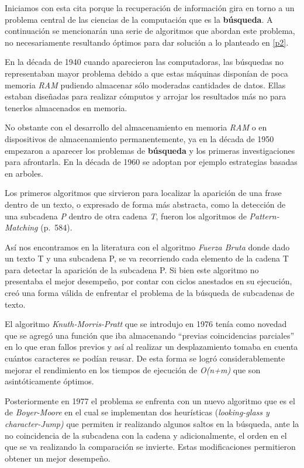 \documentclass[
  10,
  openany]{book}
\begin{document}
Iniciamos con esta cita porque la recuperación de información gira en torno a un problema central de las ciencias de la computación que es la \textbf{búsqueda}. A continuación se mencionarán una serie de algoritmos que abordan este problema, no necesariamente resultando óptimos para dar solución a lo planteado en \ref{p2}.

En la década de 1940 cuando aparecieron las computadoras, las búsquedas no representaban mayor problema debido a que estas máquinas disponían de poca memoria \emph{RAM} pudiendo almacenar sólo moderadas cantidades de datos. Ellas estaban diseñadas para realizar cómputos y arrojar los resultados más no para tenerlos almacenados en memoria.

No obstante con el desarrollo del almacenamiento en memoria \emph{RAM} o en dispositivos de almacenamiento permanentemente, ya en la década de 1950 empezaron a aparecer los problemas de \textbf{búsqueda} y los primeras investigaciones para afrontarla. En la década de 1960 se adoptan por ejemplo estrategias basadas en arboles.

Los primeros algoritmos que sirvieron para localizar la aparición de una frase dentro de un texto, o expresado de forma más abstracta, como la detección de una subcadena \emph{P} dentro de otra cadena \emph{T}, fueron los algoritmos de \emph{Pattern-Matching} \citep{goodrich2013} (p.~584).

Así nos encontramos en la literatura con el algoritmo \emph{Fuerza Bruta} donde dado un texto T y una subcadena P, se va recorriendo cada elemento de la cadena T para detectar la aparición de la subcadena P. Si bien este algoritmo no presentaba el mejor desempeño, por contar con ciclos anestados en su ejecución, creó una forma válida de enfrentar el problema de la búsqueda de subcadenas de texto.

El algoritmo \emph{Knuth-Morris-Pratt} que se introdujo en 1976 tenía como novedad que se agregó una función que iba almacenando ``previas coincidencias parciales'' en lo que eran fallos previos y así al realizar un desplazamiento tomaba en cuenta cuántos caracteres se podían reusar. De esta forma se logró considerablemente mejorar el rendimiento en los tiempos de ejecución de \emph{O(n+m)} que son asintóticamente óptimos.

Posteriormente en 1977 el problema se enfrenta con un nuevo algoritmo que es el de \emph{Boyer-Moore} en el cual se implementan dos heurísticas (\emph{looking-glass y} \emph{character-Jump)} que permiten ir realizando algunos saltos en la búsqueda, ante la no coincidencia de la subcadena con la cadena y adicionalmente, el orden en el que se va realizando la comparación se invierte. Estas modificaciones permitieron obtener un mejor desempeño.
\end{document}

